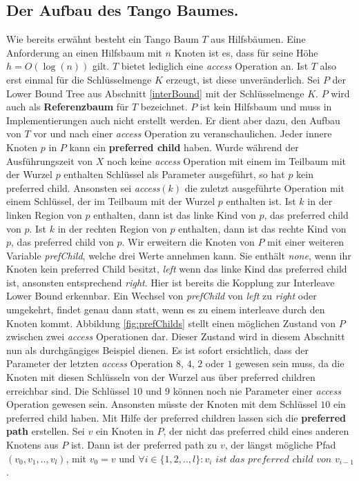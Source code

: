 \documentclass[a4paper,12pt]{article}
\begin{document}
\subsection{Der Aufbau des Tango Baumes.} \label{aufbauDesTango}
Wie bereits erwähnt besteht ein Tango Baum $T$ aus Hilfsbäumen. Eine Anforderung an einen Hilfsbaum mit $n$ Knoten ist es, dass für seine Höhe $h = O\left(\log\left( n\right)\right)$ gilt. $T$ bietet lediglich eine \textit{access} Operation an. Ist $T$ also erst einmal für die  Schlüsselmenge $K$ erzeugt, ist diese unveränderlich. Sei $P$ der Lower Bound Tree aus Abschnitt \ref{interBound} mit der Schlüsselmenge $K$. $P$ wird auch als \textbf{Referenzbaum} für $T$ bezeichnet. $P$ ist kein Hilfsbaum und muss in Implementierungen auch nicht erstellt werden. Er dient aber dazu, den Aufbau von $T$ vor und nach einer \textit{access} Operation zu veranschaulichen. Jeder innere Knoten $p$ in $P$ kann ein \textbf{preferred child} haben.  Wurde während der Ausführungszeit von $X$ noch keine \textit{access} Operation mit einem im Teilbaum mit der Wurzel $p$ enthalten Schlüssel als Parameter ausgeführt, so hat $p$ kein preferred child. Ansonsten sei \textit{access}$\left(k\right)$ die zuletzt ausgeführte Operation mit einem Schlüssel, der im Teilbaum mit der Wurzel $p$ enthalten ist. Ist $k$ in der linken Region von $p$ enthalten, dann ist das linke Kind von $p$, das preferred child von $p$. Ist $k$ in der rechten Region von $p$ enthalten, dann ist das rechte Kind von $p$, das preferred child von $p$. Wir erweitern die Knoten von $P$ mit einer weiteren Variable \textit{prefChild}, welche drei Werte annehmen kann. Sie enthält \textit{none}, wenn ihr Knoten kein preferred Child besitzt, \textit{left} wenn das linke Kind das preferred child ist, ansonsten entsprechend \textit{right}. Hier ist bereits die Kopplung zur Interleave Lower Bound erkennbar. Ein Wechsel von \textit{prefChild}  von \textit{left} zu \textit{right} oder umgekehrt, findet genau dann statt, wenn es zu einem interleave durch den Knoten kommt. Abbildung \ref{fig:prefChilds} stellt einen möglichen Zustand von $P$ zwischen zwei \textit{access} Operationen dar. Dieser Zustand wird in diesem Abschnitt nun als durchgängiges Beispiel dienen. Es ist sofort ersichtlich, dass der Parameter der letzten \textit{access} Operation $8$, $4$, $2$ oder $1$ gewesen sein muss, da die Knoten mit diesen Schlüsseln von der Wurzel aus über preferred children erreichbar sind. Die Schlüssel $10$ und $9$ können noch nie Parameter einer \textit{access} Operation gewesen sein. Ansonsten müsste der Knoten mit dem Schlüssel $10$ ein preferred child haben. Mit Hilfe der preferred children lassen sich die \textbf{preferred path} erstellen. Sei $v$ ein Knoten in $P$, der nicht das preferred child eines anderen Knotens aus $P$ ist. Dann ist der preferred path zu $v$, der längst mögliche Pfad $\left(v_0, v_1,..,v_l\right)$, mit $v_0 = v$ und $\forall i \in \{1,2,..,l\} \colon v_i \textit{ ist das preferred child von }v_{i-1   }$.  
\end{document}
